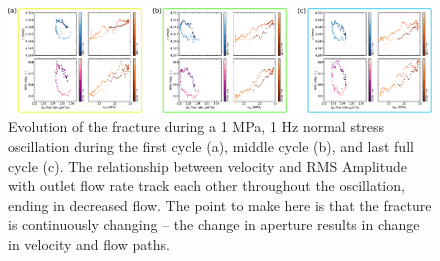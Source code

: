 

\begin{figure}
	\centering
	\includegraphics[width=0.9\columnwidth]{bowtie_p4975_run3b_01Hz_v3}
	\caption[]{Evolution of the fracture during a 1 MPa, 1 Hz normal stress oscillation during the first cycle (a), middle cycle (b), and last full cycle (c). The relationship between velocity and RMS Amplitude with outlet flow rate track each other throughout the oscillation, ending in decreased flow. The point to make here is that the fracture is continuously changing -- the change in aperture results in change in velocity and flow paths.}
	\label{fig:bowties}
\end{figure}


\newpage



